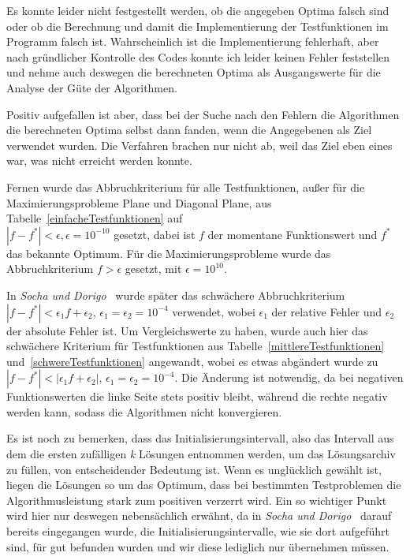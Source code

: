\documentclass[fontsize=12, a4aper]{scrartcl}
\begin{document}
	Es konnte leider nicht festgestellt werden, ob die angegeben Optima falsch sind oder ob die Berechnung und damit die Implementierung der Testfunktionen im Programm falsch ist. Wahrscheinlich ist die Implementierung fehlerhaft, aber nach gründlicher Kontrolle des Codes konnte ich leider keinen Fehler feststellen und nehme auch deswegen die berechneten Optima als Ausgangswerte für die Analyse der Güte der Algorithmen.\hfill\newline
	
	Positiv aufgefallen ist aber, dass bei der Suche nach den Fehlern die Algorithmen die berechneten Optima selbst dann fanden, wenn die Angegebenen als Ziel verwendet wurden. Die Verfahren brachen nur nicht ab, weil das Ziel eben eines war, was nicht erreicht werden konnte.\hfill\newline
	
	Fernen wurde das Abbruchkriterium für alle Testfunktionen, außer für die Maximierungsprobleme \glqq Plane\grqq \hspace{.16667em} und \glqq Diagonal Plane\grqq, aus Tabelle~\ref{einfacheTestfunktionen} auf\\
	\(|f-f^*|<\epsilon, \epsilon = 10^{-10}\) gesetzt, dabei ist \(f\) der momentane Funktionswert und \(f^*\) das bekannte Optimum. Für die Maximierungsprobleme wurde das Abbruchkriterium \(f>\epsilon\) gesetzt, mit \(\epsilon=10^{10}\).\hfill\newline
	
	In \textit{Socha und Dorigo}~\cite{socha2008ant} wurde später das schwächere Abbruchkriterium\\
	\(|f-f^*|<\epsilon_1f + \epsilon_2\), \(\epsilon_1=\epsilon_2=10^{-4}\) verwendet, wobei \(\epsilon_1\) der relative Fehler und \(\epsilon_2\) der absolute Fehler ist. Um Vergleichswerte zu haben, wurde auch hier das schwächere Kriterium für Testfunktionen aus Tabelle~\ref{mittlereTestfunktionen} und~\ref{schwereTestfunktionen}	angewandt, wobei es etwas abgändert wurde zu \(|f-f^*|<|\epsilon_1f + \epsilon_2|\), \(\epsilon_1=\epsilon_2=10^{-4}\). Die Änderung ist notwendig, da bei negativen Funktionswerten die linke Seite stets positiv bleibt, während die rechte negativ werden kann, sodass die Algorithmen nicht konvergieren.\hfill\newline
	
	Es ist noch zu bemerken, dass das Initialisierungsintervall, also das Intervall aus dem die ersten zufälligen \textit{k} Lösungen entnommen werden, um das Lösungsarchiv zu füllen, von entscheidender Bedeutung ist. Wenn es unglücklich gewählt ist, liegen die Lösungen so um das Optimum, dass bei bestimmten Testproblemen die Algorithmusleistung stark zum positiven verzerrt wird. Ein so wichtiger Punkt wird hier nur deswegen nebensächlich erwähnt, da in \textit{Socha und Dorigo}~\cite{socha2008ant} darauf bereits eingegangen wurde, die Initialisierungsintervalle, wie sie dort aufgeführt sind, für gut befunden wurden und wir diese lediglich nur übernehmen müssen.\hfill\newline
	
\end{document}
